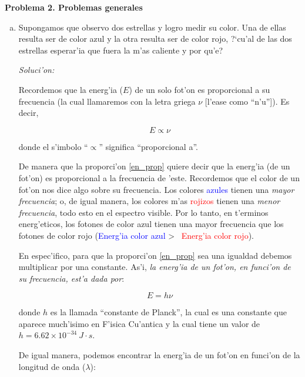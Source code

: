 \documentclass{article}
\newenvironment{myfont}{\fontfamily{pnc}\selectfont}{\par}
\begin{document}
\vspace{3mm}

\textbf{Problema 2. Problemas generales}

\begin{enumerate}[a)]
\item \begin{myfont}Supongamos que observo dos estrellas y logro medir su color. Una de ellas resulta ser de color azul y la otra resulta ser de color rojo, ?`cu'al de las dos estrellas esperar'ia que fuera la m'as caliente y por qu'e?\end{myfont}


\emph{Soluci'on:}


Recordemos que la energ'ia ($E$) de un solo fot'on es proporcional a su frecuencia (la cual llamaremos con la letra griega $\nu$ [l'ease como ``n'u'']). Es decir,

\begin{equation}\label{en_prop}
E \propto \nu
\end{equation}

donde el s'imbolo ``$\propto$'' significa ``proporcional a''.

De manera que la proporci'on \eqref{en_prop} quiere decir que la energ'ia (de un fot'on) es proporcional a la frecuencia de 'este. Recordemos que el color de un fot'on nos dice algo sobre su frecuencia. Los colores \textcolor{blue}{azules} tienen una \emph{mayor frecuencia}; o, de igual manera, los colores m'as \textcolor{red}{rojizos} tienen una \emph{menor frecuencia}, todo esto en el espectro visible. Por lo tanto, en t'erminos energ'eticos, los fotones de color azul tienen una mayor frecuencia que los fotones de color rojo (\textcolor{blue}{Energ'ia color azul} > \ \textcolor{red}{Energ'ia color rojo}).

En espec'ifico, para que la proporci'on \eqref{en_prop} sea una igualdad debemos multiplicar por una constante. As'i, \emph{la energ'ia de un fot'on, en funci'on de su frecuencia, est'a dada por}:

\begin{equation} \label{energia_nu}
E = h \nu
\end{equation}

donde $h$ es la llamada ``constante de Planck'', la cual es una constante que aparece much'isimo en F'isica Cu'antica y la cual tiene un valor de $h = 6.62 \times 10^{-34} \ J \cdot s$.

De igual manera, podemos encontrar la energ'ia de un fot'on en funci'on de la longitud de onda ($\lambda$):


\end{enumerate}
\end{document}
